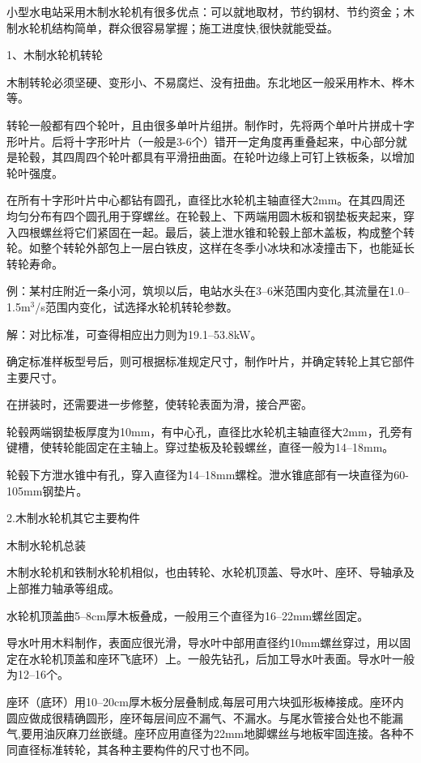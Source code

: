 \documentclass{ctexbook}
\begin{document}
小型水电站采用木制水轮机有很多优点：可以就地取材，节约钢材、节约资金；木制水轮机结构简单，群众很容易掌握；施工进度快,很快就能受益。

1、木制水轮机转轮

木制转轮必须坚硬、变形小、不易腐烂、没有扭曲。东北地区一般采用柞木、桦木等。

转轮一般都有四个轮叶，且由很多单叶片组拼。制作时，先将两个单叶片拼成十字形叶片。后将十字形叶片（一般是3-6个）错开一定角度再重叠起来，中心部分就是轮毂，其四周四个轮叶都具有平滑扭曲面。在轮叶边缘上可钉上铁板条，以增加轮叶强度。

在所有十字形叶片中心都钻有圆孔，直径比水轮机主轴直径大2mm。在其四周还均匀分布有四个圆孔用于穿螺丝。在轮毂上、下两端用圆木板和钢垫板夹起来，穿入四根螺丝将它们紧固在一起。最后，装上泄水锥和轮毂上部木盖板，构成整个转轮。如整个转轮外部包上一层白铁皮，这样在冬季小冰块和冰凌撞击下，也能延长转轮寿命。

例：某村庄附近一条小河，筑坝以后，电站水头在3--6米范围内变化,其流量在1.0--1.5m$^3$/s范围内变化，试选择水轮机转轮参数。

解：对比标准，可查得相应出力则为19.1--53.8kW。

确定标准样板型号后，则可根据标准规定尺寸，制作叶片，并确定转轮上其它部件主要尺寸。

在拼装时，还需要进一步修整，使转轮表面为滑，接合严密。

轮毂两端钢垫板厚度为10mm，有中心孔，直径比水轮机主轴直径大2mm，孔旁有键槽，使转轮能固定在主轴上。穿过垫板及轮毂螺丝，直径一般为14--18mm。

轮毂下方泄水锥中有孔，穿入直径为14--18mm螺栓。泄水锥底部有一块直径为60-105mm钢垫片。

2.木制水轮机其它主要构件

木制水轮机总装

木制水轮机和铁制水轮机相似，也由转轮、水轮机顶盖、导水叶、座环、导轴承及上部推力轴承等组成。

水轮机顶盖曲5--8cm厚木板叠成，一般用三个直径为16--22mm螺丝固定。

导水叶用木料制作，表面应很光滑，导水叶中部用直径约10mm螺丝穿过，用以固定在水轮机顶盖和座环飞底环）上。一般先钻孔，后加工导水叶表面。导水叶一般为12--16个。

座环（底环）用10--20cm厚木板分层叠制成,每层可用六块弧形板棒接成。座环内圆应做成很精确圆形，座环每层间应不漏气、不漏水。与尾水管接合处也不能漏气,要用油灰麻刀丝嵌缝。座环应用直径为22mm地脚螺丝与地板牢固连接。各种不同直径标准转轮，其各种主要构件的尺寸也不同。
\end{document}
